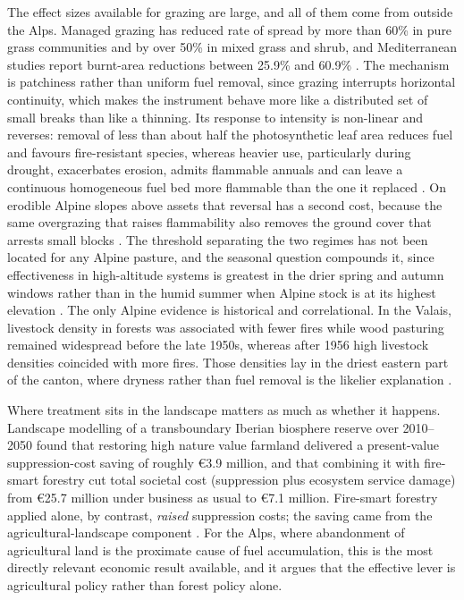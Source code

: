 \documentclass[11pt,a4paper]{article}
\begin{document}
The effect sizes available for grazing are large, and all of them come from outside the Alps. Managed grazing has reduced rate of spread by more than 60\% in pure grass communities and by over 50\% in mixed grass and shrub, and Mediterranean studies report burnt-area reductions between 25.9\% and 60.9\% \citep{xu_how_2026}. The mechanism is patchiness rather than uniform fuel removal, since grazing interrupts horizontal continuity, which makes the instrument behave more like a distributed set of small breaks than like a thinning. Its response to intensity is non-linear and reverses: removal of less than about half the photosynthetic leaf area reduces fuel and favours fire-resistant species, whereas heavier use, particularly during drought, exacerbates erosion, admits flammable annuals and can leave a continuous homogeneous fuel bed more flammable than the one it replaced \citep{xu_how_2026}. On erodible Alpine slopes above assets that reversal has a second cost, because the same overgrazing that raises flammability also removes the ground cover that arrests small blocks \citep{asteriou_assessing_2025}. The threshold separating the two regimes has not been located for any Alpine pasture, and the seasonal question compounds it, since effectiveness in high-altitude systems is greatest in the drier spring and autumn windows rather than in the humid summer when Alpine stock is at its highest elevation \citep{xu_how_2026}. The only Alpine evidence is historical and correlational. In the Valais, livestock density in forests was associated with fewer fires while wood pasturing remained widespread before the late 1950s, whereas after 1956 high livestock densities coincided with more fires. Those densities lay in the driest eastern part of the canton, where dryness rather than fuel removal is the likelier explanation \citep{zumbrunnen_human_2012}.

Where treatment sits in the landscape matters as much as whether it happens. Landscape modelling of a transboundary Iberian biosphere reserve over 2010--2050 found that restoring high nature value farmland delivered a present-value suppression-cost saving of roughly €3.9 million, and that combining it with fire-smart forestry cut total societal cost (suppression plus ecosystem service damage) from €25.7 million under business as usual to €7.1 million. Fire-smart forestry applied alone, by contrast, \emph{raised} suppression costs; the saving came from the agricultural-landscape component \citep{lecinadiaz_incorporating_2023}. For the Alps, where abandonment of agricultural land is the proximate cause of fuel accumulation, this is the most directly relevant economic result available, and it argues that the effective lever is agricultural policy rather than forest policy alone.
\end{document}
